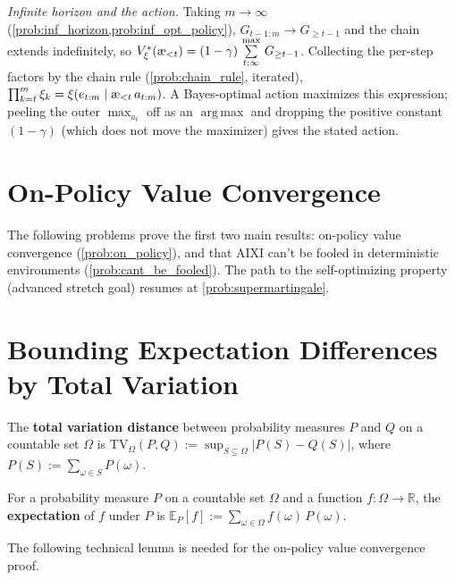 \documentclass[fontsize=11pt, parskip=half]{scrartcl}
\newcommand{\Ex}{\mathbb{E}}
\DeclareMathOperator*{\argmax}{arg\,max}
\newcommand{\exmaxsym}{\mathop{\mathchoice
  {\overset{\textstyle\max}{\textstyle\sum}}%
  {\overset{\max}{\sum}}%
  {\overset{\scriptstyle\max}{\scriptstyle\sum}}%
  {\overset{\scriptscriptstyle\max}{\scriptscriptstyle\sum}}}}
\newcommand{\exmax}{\exmaxsym\limits}
\newcommand{\TV}[1][]{\mathrm{TV}_{#1}}
\newcommand{\aes}{\textnormal{\ae}}
\begin{document}
\begin{solution}
\emph{Infinite horizon and the action.} Taking $m \to \infty$ (\cref{prob:inf_horizon,prob:inf_opt_policy}), $G_{t-1:m} \to G_{\geq t-1}$ and the chain extends indefinitely, so $V_\xi^*(\aes_{<t}) = (1-\gamma)\, \exmax_{t:\infty}\, G_{\geq t-1}$. Collecting the per-step factors by the chain rule (\cref{prob:chain_rule}, iterated), $\prod_{k=t}^{m} \xi_k = \xi(e_{t:m} \mid \aes_{<t}\, a_{t:m})$. A Bayes-optimal action maximizes this expression; peeling the outer $\max_{a_t}$ off as an $\argmax$ and dropping the positive constant $(1-\gamma)$ (which does not move the maximizer) gives the stated action.
\end{solution}


\section*{On-Policy Value Convergence}

The following problems prove the first two main results: on-policy value convergence (\cref{prob:on_policy}), and that AIXI can't be fooled in deterministic environments (\cref{prob:cant_be_fooled}).
The path to the self-optimizing property (advanced stretch goal) resumes at \cref{prob:supermartingale}.

\section{Bounding Expectation Differences by Total Variation}\label{prob:tv_bound}

\begin{definition}\label{def:tv}
The \textbf{total variation distance} between probability measures $P$ and $Q$ on a countable set $\Omega$ is $\TV[\Omega](P, Q) := \sup_{S \subseteq \Omega} |P(S) - Q(S)|$, where $P(S) := \sum_{\omega \in S} P(\omega)$.
\end{definition}

\begin{definition}\label{def:expectation_P}
For a probability measure $P$ on a countable set $\Omega$ and a function $f : \Omega \to \mathbb{R}$, the \textbf{expectation} of $f$ under $P$ is
$\Ex_P[f] := \sum_{\omega \in \Omega} f(\omega)\, P(\omega)$.
\end{definition}

The following technical lemma is needed for the on-policy value convergence proof.
\end{document}
